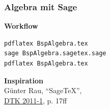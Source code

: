 \documentclass[]{beamer}
\begin{document}
\begin{frame}[fragile]
\frametitle{Algebra mit Sage}

\begin{minipage}{.45\linewidth}
\end{minipage}
\hfill
\begin{minipage}{.45\linewidth}
\textbf{Workflow}
\begin{lstlisting}[style=arn:lst:bash]
pdflatex BspAlgebra.tex
sage BspAlgebra.sagetex.sage
pdflatex BspAlgebra.tex
\end{lstlisting}

\bigskip

\textbf{Inspiration}\\
Günter Rau, \enquote{Sage\TeX{}},\\ \href{http://archiv.dante.de/DTK/PDF/komoedie_2011_1.pdf}{DTK 2011-1}, p. 17ff

\end{minipage}

\end{frame}
\end{document}
